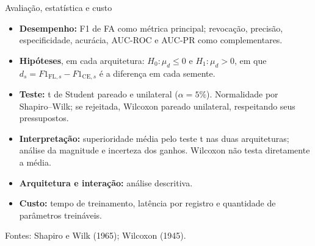 \documentclass[aspectratio=169,12pt,brazil]{beamer}
\begin{document}
\begin{frame}{Avaliação, estatística e custo}
  \small
  \begin{itemize}

    \item \textbf{Desempenho:} F1 de FA como
    métrica principal; revocação, precisão,
    especificidade, acurácia, AUC-ROC e AUC-PR
    como complementares.

    \item \textbf{Hipóteses}, em cada arquitetura:
    $H_0:\mu_d\leq 0$ e $H_1:\mu_d>0$,
    em que $d_s=F1_{\mathrm{FL},s}-F1_{\mathrm{CE},s}$
    é a diferença em cada semente.

    \item \textbf{Teste:} t de Student pareado
    e unilateral ($\alpha=5\%$).
    Normalidade por Shapiro--Wilk; se rejeitada,
    Wilcoxon pareado unilateral, respeitando
    seus pressupostos.

    \item \textbf{Interpretação:} superioridade
    média pelo teste t nas duas arquiteturas;
    análise da magnitude e incerteza dos ganhos.
    Wilcoxon não testa diretamente a média.

    \item \textbf{Arquitetura e interação:}
    análise descritiva.

    \item \textbf{Custo:} tempo de treinamento,
    latência por registro e quantidade de
    parâmetros treináveis.

  \end{itemize}
  {\scriptsize Fontes: Shapiro e Wilk (1965);
  Wilcoxon (1945).}
\end{frame}
\end{document}
